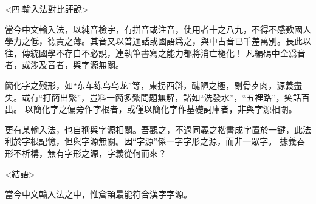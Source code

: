\documentclass{article}
\begin{document}
<四.輸入法對比評說>

當今中文輸入法，以純音檢字，有拼音或注音，使用者十之八九，不得不感歎國人學力之低，德責之薄。其音又以普通話或國語爲之，與中古音已千差萬別。長此以往，傳統國學不存自不必說，連執筆書寫之能力都將消亡褪化！
凡編碼中全爲音者，或涉及音者，與字源無關。

簡化字之殘形，如“东车练鸟乌龙”等，東拐西斜，醜陋之極，剮骨歺肉，源義盡失。或有“打簡出繁”，豈料一簡多繁問題無解，諸如“洗發水”，“五裡路”，笑話百出。
以簡化字之偏旁作字根者，或僅以簡化字作基礎詞庫者，非與字源相關。

更有某輸入法，也自稱與字源相關。吾觀之，不過同義之楷書成字置於一鍵，此法利於字根記憶，但與字源無關。因“字源”係一字字形之源，而非一眾字。
據義吞形不析構，無有字形之源，字義從何而來？



<結語>

當今中文輸入法之中，惟倉頡最能符合漢字字源。
\end{document}
